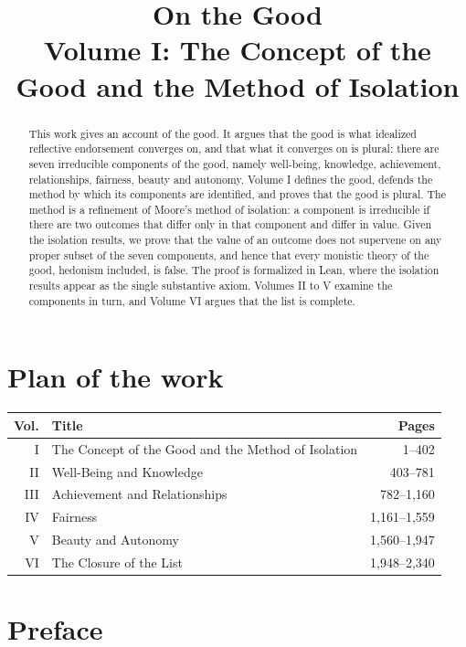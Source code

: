 \documentclass{situationist-preprint}
\title{On the Good\\[0.4em]\large Volume I: The Concept of the Good and the Method of Isolation}
\begin{document}
\maketitle

\begin{abstract}
This work gives an account of the good. It argues that the good is what idealized reflective endorsement converges on, and that what it converges on is plural: there are seven irreducible components of the good, namely well-being, knowledge, achievement, relationships, fairness, beauty and autonomy. Volume I defines the good, defends the method by which its components are identified, and proves that the good is plural. The method is a refinement of Moore's method of isolation: a component is irreducible if there are two outcomes that differ only in that component and differ in value. Given the isolation results, we prove that the value of an outcome does not supervene on any proper subset of the seven components, and hence that every monistic theory of the good, hedonism included, is false. The proof is formalized in Lean, where the isolation results appear as the single substantive axiom. Volumes II to V examine the components in turn, and Volume VI argues that the list is complete.
\end{abstract}

\section*{Plan of the work}

\begin{center}\small
\begin{tabular}{@{}rlr@{}}
\toprule
Vol. & Title & Pages \\
\midrule
I & The Concept of the Good and the Method of Isolation & 1--402 \\
II & Well-Being and Knowledge & 403--781 \\
III & Achievement and Relationships & 782--1,160 \\
IV & Fairness & 1,161--1,559 \\
V & Beauty and Autonomy & 1,560--1,947 \\
VI & The Closure of the List & 1,948--2,340 \\
\bottomrule
\end{tabular}
\end{center}

\section*{Preface}
\end{document}
